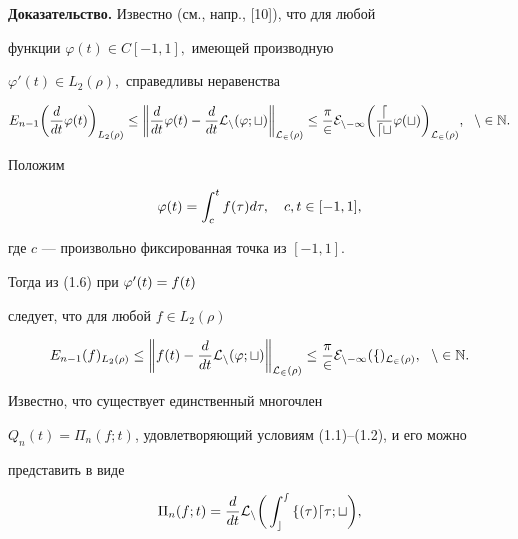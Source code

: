 {\bf Доказательство.} Известно (см., напр., [10]), что для любой


функции $\varphi(t) \in C[-1,1],$ имеющей производную


$\varphi'(t)\in L_2(\rho),$ справедливы неравенства


\begin{equation}


E_{n-1}\bigg(\frac{d}{dt}\varphi(t)\bigg)_{L_2(\rho)}


\le \bigg


\|\frac{d}{dt}\varphi(t)-\frac{d}{dt}\cal L_n(\varphi;t)


\bigg\|_{L_2(\rho)}\le


\frac{\pi}{2}E_{n-1}\bigg( \frac{d}{dt} \varphi(t)\bigg)_{L_2(\rho)},


\ \ n \in \Bbb N.


\end{equation}


Положим


\begin{equation}


\vp(t) = \int_c^t f(\tau)d\tau, \quad c,t \in [-1,1],


\end{equation}


где $c$ --- произвольно фиксированная точка из $[-1,1]$.


Тогда из (1.6) при $\varphi'(t)=f(t)$


следует, что для любой $f\in L_2(\rho)$


\begin{equation}


E_{n-1}(f)_{L_2(\rho)}\le


\bigg\|


f(t) - \frac{d}{dt}\cal L_n(\vp;t)


\bigg\|_{L_2(\rho)}\le\frac{\pi}{2} E_{n-1}(f)_{L_2(\rho)},


\ \  n \in \Bbb N.


\end{equation}


Известно, что существует единственный многочлен


$Q_n(t)=\Pi_n(f;t)$, удовлетворяющий условиям (1.1)--(1.2), и его можно


представить в виде


\begin{equation}


\Pi_n(f;t)=\frac{d}{dt}\cal L_n\bigg(\int_c^s f(\tau)d\tau;t\bigg),


\end{equation}


